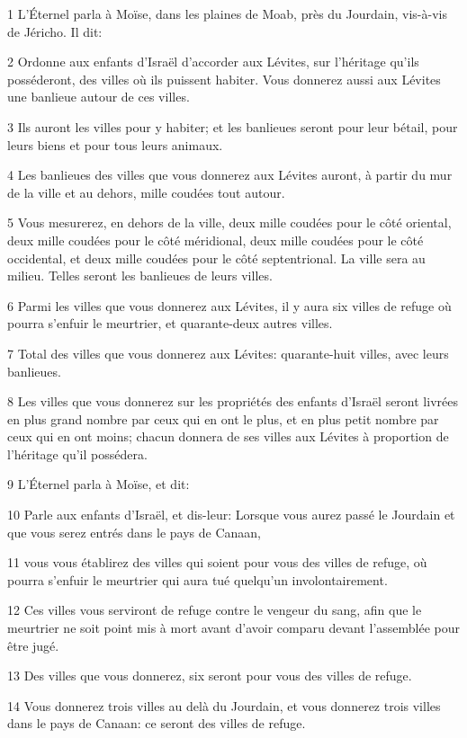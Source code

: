 \par 1 L'Éternel parla à Moïse, dans les plaines de Moab, près du Jourdain, vis-à-vis de Jéricho. Il dit:
\par 2 Ordonne aux enfants d'Israël d'accorder aux Lévites, sur l'héritage qu'ils posséderont, des villes où ils puissent habiter. Vous donnerez aussi aux Lévites une banlieue autour de ces villes.
\par 3 Ils auront les villes pour y habiter; et les banlieues seront pour leur bétail, pour leurs biens et pour tous leurs animaux.
\par 4 Les banlieues des villes que vous donnerez aux Lévites auront, à partir du mur de la ville et au dehors, mille coudées tout autour.
\par 5 Vous mesurerez, en dehors de la ville, deux mille coudées pour le côté oriental, deux mille coudées pour le côté méridional, deux mille coudées pour le côté occidental, et deux mille coudées pour le côté septentrional. La ville sera au milieu. Telles seront les banlieues de leurs villes.
\par 6 Parmi les villes que vous donnerez aux Lévites, il y aura six villes de refuge où pourra s'enfuir le meurtrier, et quarante-deux autres villes.
\par 7 Total des villes que vous donnerez aux Lévites: quarante-huit villes, avec leurs banlieues.
\par 8 Les villes que vous donnerez sur les propriétés des enfants d'Israël seront livrées en plus grand nombre par ceux qui en ont le plus, et en plus petit nombre par ceux qui en ont moins; chacun donnera de ses villes aux Lévites à proportion de l'héritage qu'il possédera.
\par 9 L'Éternel parla à Moïse, et dit:
\par 10 Parle aux enfants d'Israël, et dis-leur: Lorsque vous aurez passé le Jourdain et que vous serez entrés dans le pays de Canaan,
\par 11 vous vous établirez des villes qui soient pour vous des villes de refuge, où pourra s'enfuir le meurtrier qui aura tué quelqu'un involontairement.
\par 12 Ces villes vous serviront de refuge contre le vengeur du sang, afin que le meurtrier ne soit point mis à mort avant d'avoir comparu devant l'assemblée pour être jugé.
\par 13 Des villes que vous donnerez, six seront pour vous des villes de refuge.
\par 14 Vous donnerez trois villes au delà du Jourdain, et vous donnerez trois villes dans le pays de Canaan: ce seront des villes de refuge.
